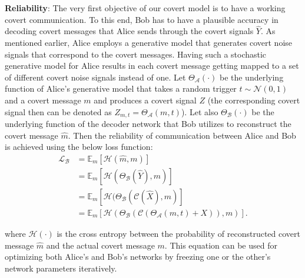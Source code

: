 \textbf{Reliability}: The very first objective of our covert model is to have a working covert communication. To this end, Bob has to have a plausible accuracy in decoding covert messages that Alice sends through the covert signals \(\hat{Y}\). As mentioned earlier, Alice employs a generative model that generates covert noise signals that correspond to the covert messages. Having such a stochastic generative model for Alice results in each covert message getting mapped to a set of different covert noise signals instead of one. Let \(\Theta_{\mathcal{A}}(\cdot)\) be the underlying function of Alice's generative model that takes a random trigger \(t \sim \mathcal{N}(0, 1)\) and a covert message \(m\) and produces a covert signal \(Z\) (the corresponding covert signal then can be denoted as \(Z_{m, t} = \Theta_{\mathcal{A}}(m, t)\)). Let also  \(\Theta_{\mathcal{B}}(\cdot)\) be the underlying function of the decoder network that Bob utilizes to reconstruct the covert message \(\hat{m}\). Then the reliability of communication between Alice and Bob is achieved using the below loss function:
\begin{equation}
	\begin{aligned} \label{bob_loss}
	\mathcal{L}_{\mathcal{B}} & = \mathbb{E}_{m}[\mathcal{H}(\hat{m}, m)] \\
	& = \mathbb{E}_{m}[\mathcal{H}(\Theta_{\mathcal{B}}(\hat{Y}), m)] \\ 
	& = \mathbb{E}_{m}[\mathcal{H}(\Theta_{\mathcal{B}}(\mathcal{C}(\hat{X}), m)] \\ 
	& = \mathbb{E}_{m}[\mathcal{H}(\Theta_{\mathcal{B}}(\mathcal{C}(\Theta_{\mathcal{A}}(m, t) + X)), m)].
	\end{aligned}
\end{equation}


where \(\mathcal{H}(\cdot)\) is the cross entropy between the probability of reconstructed covert message \(\hat{m}\) and the actual covert message \(m\). This equation can be used for optimizing both Alice's and Bob's networks by freezing one or the other's network parameters iteratively. 


